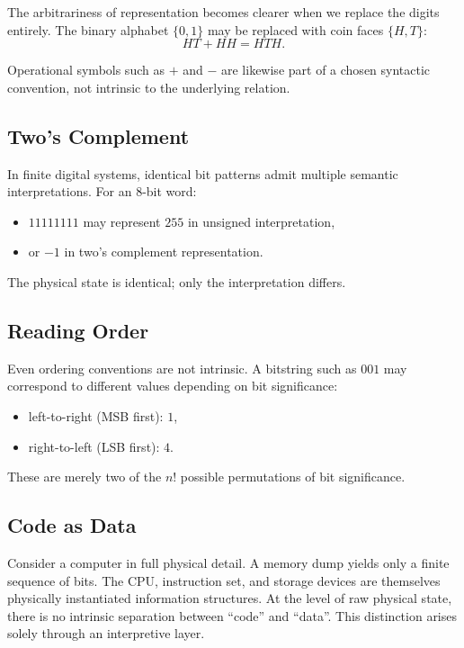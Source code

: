 The arbitrariness of representation becomes clearer when we replace the digits entirely.
The binary alphabet $\{0,1\}$ may be replaced with coin faces $\{H,T\}$:
\[
HT + HH = HTH.
\]

Operational symbols such as $+$ and $-$ are likewise part of a chosen syntactic convention, not intrinsic to the underlying relation.

\subsection*{Two's Complement}

In finite digital systems, identical bit patterns admit multiple semantic interpretations.
For an 8-bit word:
\begin{itemize}
\item $11111111$ may represent $255$ in unsigned interpretation,
\item or $-1$ in two's complement representation.
\end{itemize}

The physical state is identical; only the interpretation differs.

\subsection*{Reading Order}

Even ordering conventions are not intrinsic.
A bitstring such as $001$ may correspond to different values depending on bit significance:
\begin{itemize}
\item left-to-right (MSB first): $1$,
\item right-to-left (LSB first): $4$.
\end{itemize}

These are merely two of the $n!$ possible permutations of bit significance.

\subsection*{Code as Data}

Consider a computer in full physical detail.
A memory dump yields only a finite sequence of bits.
The CPU, instruction set, and storage devices are themselves physically instantiated information structures.
At the level of raw physical state, there is no intrinsic separation between ``code'' and ``data''.
This distinction arises solely through an interpretive layer.

